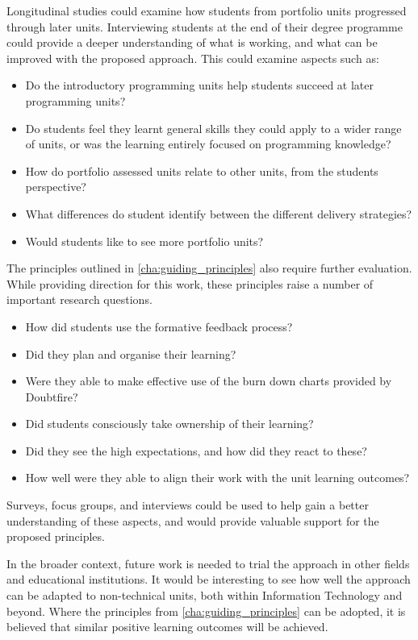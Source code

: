 
Longitudinal studies could examine how students from portfolio units progressed through later units. Interviewing students at the end of their degree programme could provide a deeper understanding of what is working, and what can be improved with the proposed approach. This could examine aspects such as:
\begin{itemize}[noitemsep,nolistsep]
	\item Do the introductory programming units help students succeed at later programming units?
	\item Do students feel they learnt general skills they could apply to a wider range of units, or was the learning entirely focused on programming knowledge? 
	\item How do portfolio assessed units relate to other units, from the students perspective?
	\item What differences do student identify between the different delivery strategies?
	\item Would students like to see more portfolio units?
\end{itemize}

The principles outlined in \cref{cha:guiding_principles} also require further evaluation. While providing direction for this work, these principles raise a number of important research questions. 

\begin{itemize} [noitemsep,nolistsep]
	\item How did students use the formative feedback process? 
	\item Did they plan and organise their learning? 
	\item Were they able to make effective use of the burn down charts provided by Doubtfire? 
	\item Did students consciously take ownership of their learning? 
	\item Did they see the high expectations, and how did they react to these? 
	\item How well were they able to align their work with the unit learning outcomes?
\end{itemize}

Surveys, focus groups, and interviews could be used to help gain a better understanding of these aspects, and would provide valuable support for the proposed principles. 

In the broader context, future work is needed to trial the approach in other fields and educational institutions. It would be interesting to see how well the approach can be adapted to non-technical units, both within Information Technology and beyond. Where the principles from \cref{cha:guiding_principles} can be adopted, it is believed that similar positive learning outcomes will be achieved.

